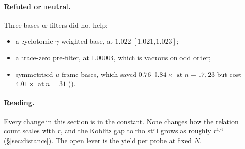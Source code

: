 \paragraph{Refuted or neutral.} Three bases or filters did not help:
\begin{itemize}
\item a cyclotomic $\gamma$-weighted base, at $1.022$ $[1.021,1.023]$;
\item a trace-zero pre-filter, at $1.00003$, which is vacuous on odd order;
\item symmetrised $u$-frame bases, which saved $0.76$--$0.84\times$ at
  $n=17,23$ but cost $4.01\times$ at $n=31$
  ().
\end{itemize}

\paragraph{Reading.} Every change in this section is  in
the constant. None changes how the relation count scales with $r$, and the
Koblitz gap to rho still grows as roughly $r^{1/6}$ (\S\ref{sec:distance}).
The open lever is the yield per probe at fixed $N$.
